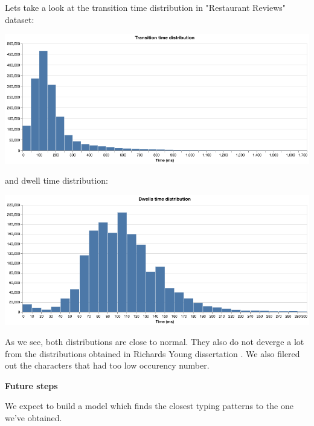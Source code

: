 \documentclass[12pt,a4]{article}
\begin{document}
Lets take a look at the transition time distribution in "Restaurant Reviews" dataset:
\begin{center}
\centering
\includegraphics[width=0.85\linewidth]{images/transitions_time.png}
\end{center}

and dwell time distribution:

\begin{center}
	\includegraphics[width=0.85\linewidth]{images/dwells_time.png}
	\label{fig:transitions_time.png}
\end{center}

As we see, both distributions are close to normal. They also do not deverge a lot from the distributions obtained in Richards Young dissertation \cite{richards_young_2018}.
We also filered out the characters that had too low occurency number.

\bigskip
\large\textbf{Future steps}
\bigskip
\normalsize

We expect to build a model which finds the closest typing patterns to the one we've obtained.

{}

\end{document}
